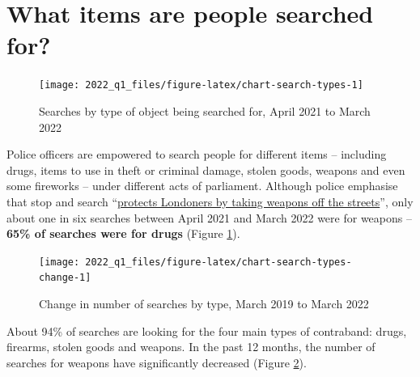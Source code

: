 \documentclass[
  a4paper,
  twoside, 11pt]{article}
\begin{document}
\hypertarget{what-items-are-people-searched-for}{%
\section{What items are people searched for?}\label{what-items-are-people-searched-for}}



\begin{figure}[tb]

{\centering \texttt{[image: 2022\_q1\_files/figure-latex/chart-search-types-1]} 

}

\caption{Searches by type of object being searched for, April 2021 to March 2022}\label{fig:chart-search-types}
\end{figure}

Police officers are empowered to search people for different items -- including drugs, items to use in theft or criminal damage, stolen goods, weapons and even some fireworks -- under different acts of parliament. Although police emphasise that stop and search ``\href{https://www.met.police.uk/police-forces/metropolitan-police/areas/about-us/about-the-met/stop-and-search/}{protects Londoners by taking weapons off the streets}'', only about one in six searches between April 2021 and March 2022 were for weapons -- \textbf{65\% of searches were for drugs} (Figure \ref{fig:chart-search-types}).



\begin{figure}[bh]

{\centering \texttt{[image: 2022\_q1\_files/figure-latex/chart-search-types-change-1]} 

}

\caption{Change in number of searches by type, March 2019 to March 2022}\label{fig:chart-search-types-change}
\end{figure}

About 94\% of searches are looking for the four main types of contraband: drugs, firearms, stolen goods and weapons. In the past 12 months, the number of searches for weapons have significantly decreased (Figure \ref{fig:chart-search-types-change}).
\end{document}
